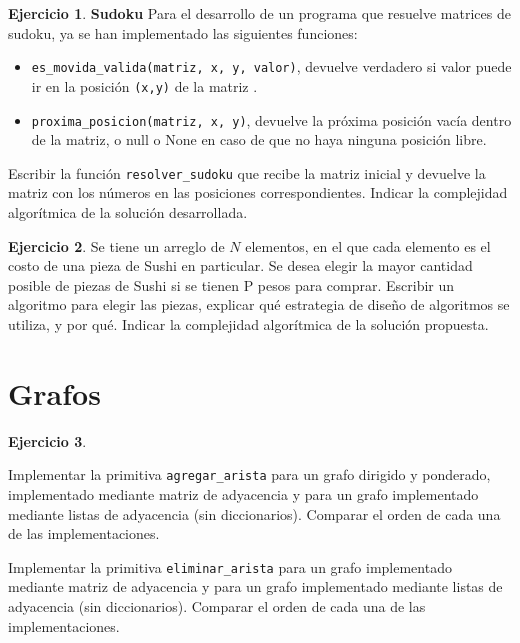 \documentclass[11pt,a4paper]{article}
\theoremstyle{definition}
\newtheorem{ejercicio}{Ejercicio}[section]
\begin{document}
\begin{ejercicio}
\textbf{Sudoku} Para el desarrollo de un programa que resuelve matrices de
sudoku, ya se han implementado las siguientes funciones:
\begin{itemize}
\item \lstinline!es_movida_valida(matriz, x, y, valor)!, devuelve verdadero
si valor puede ir en la posición \lstinline!(x,y)! de la matriz .

\item \lstinline!proxima_posicion(matriz, x, y)!, devuelve la próxima posición vacía dentro
de la matriz, o null o None en caso de que no haya ninguna posición libre.
\end{itemize}

Escribir la función \lstinline!resolver_sudoku! que recibe la matriz
inicial y devuelve la matriz con los números en las posiciones
correspondientes.  Indicar la complejidad algorítmica de la solución
desarrollada.
\end{ejercicio}

\begin{ejercicio}
Se tiene un arreglo de $N$ elementos, en el que cada elemento es el costo
de una pieza de Sushi en particular.
Se desea elegir la mayor cantidad posible de piezas de Sushi si se tienen P
pesos para comprar.  Escribir un algoritmo para elegir las piezas, explicar
qué estrategia de diseño de algoritmos se utiliza, y por qué.  Indicar la
complejidad algorítmica de la solución propuesta.
\end{ejercicio}



\newpage
\section{Grafos}

\begin{ejercicio}
\begin{partes}
\item Implementar la primitiva \lstinline!agregar_arista! para un grafo dirigido
y ponderado, implementado mediante matriz de adyacencia y para un grafo
implementado mediante listas de adyacencia (sin diccionarios). Comparar el
orden de cada una de las implementaciones.
\item Implementar la primitiva \lstinline!eliminar_arista! para un grafo
implementado mediante matriz de adyacencia y para un grafo implementado
mediante listas de adyacencia (sin diccionarios). Comparar el orden de cada
una de las implementaciones.
\end{partes}
\end{ejercicio}
\end{document}
